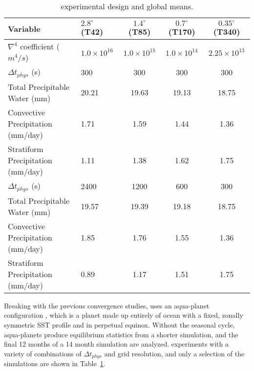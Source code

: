  \begin{table}
 \caption{\cite{W2008TELLUS} experimental design and global means.}
 \centering
 \scriptsize
 \begin{tabular}{llccc}
 \hline
 Variable & $2.8^{\circ}$ (T42) & $1.4^{\circ}$ (T85) & $0.7^{\circ}$ (T170) & $0.35^{\circ}$ (T340)\\
 \hline
   $\nabla^{4}$ coefficient ($m^4/s$) & $1.0 \times 10^{16}$ & $1.0 \times 10^{15}$ & $1.0 \times 10^{14}$ & $2.25 \times 10^{13}$ \\      
   $\Delta t_{phys}$ (s) & 300 & 300 & 300 & 300 \\
   Total Precipitable Water (mm) & 20.21 & 19.63 & 19.13 & 18.75 \\
   Convective Precipitation (mm/day) & 1.71 & 1.59 & 1.44 & 1.36 \\
   Stratiform Precipitation (mm/day) & 1.11 & 1.38 & 1.62 & 1.75 \\
   \hline
   $\Delta t_{phys}$ (s) & 2400 & 1200 & 600 & 300 \\
   Total Precipitable Water (mm) & 19.57 & 19.39 & 19.18 & 18.75 \\
   Convective Precipitation (mm/day) & 1.85 & 1.76 & 1.55 & 1.36 \\
   Stratiform Precipitation (mm/day) & 0.89 & 1.17 & 1.51 & 1.75 \\      
 \hline
 \end{tabular}
 \label{tbl:table1-3}
 \end{table}

Breaking with the previous convergence studies, \cite{W2008TELLUS} uses an aqua-planet configuration \citep[`CONTROL' in][]{NH2000ASL}, which is a planet made up entirely of ocean with a fixed, zonally symmetric SST profile and in perpetual equinox. Without the seasonal cycle, aqua-planets produce equilibrium statistics from a shorter simulation, and the final 12 months of a 14 month simulation are analyzed. \cite{W2008TELLUS} experiments with a variety of combinations of $\Delta t_{phys}$ and grid resolution, and only a selection of the simulations are shown in Table~\ref{tbl:table1-3}. 


